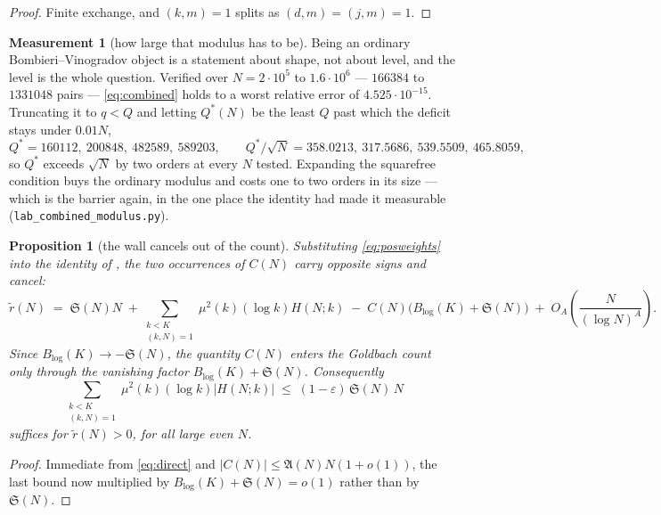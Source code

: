 \documentclass[11pt,a4paper]{article}
\theoremstyle{plain}
\newtheorem{proposition}[theorem]{Proposition}
\theoremstyle{definition}
\newtheorem{measurement}[theorem]{Measurement}
\theoremstyle{remark}
\renewcommand{\SS}{\mathfrak{S}}
\newcommand{\AAA}{\mathfrak{A}}
\begin{document}
\begin{proof}
Finite exchange, and $(k,m)=1$ splits as $(d,m)=(j,m)=1$.
\end{proof}

\begin{measurement}[how large that modulus has to be]\label{meas:combmod}
Being an ordinary Bombieri--Vinogradov object is a statement about
shape, not about level, and the level is the whole question. Verified
over $N=2\cdot10^5$ to $1.6\cdot10^6$ --- $166384$ to $1331048$ pairs
--- \eqref{eq:combined} holds to a worst relative error of
$4.525\cdot10^{-15}$. Truncating it to $q<Q$ and letting $Q^*(N)$ be
the least $Q$ past which the deficit stays under $0.01N$,
\[
  Q^*=160112,\ 200848,\ 482589,\ 589203,
  \qquad
  Q^*/\sqrt N=358.0213,\ 317.5686,\ 539.5509,\ 465.8059,
\]
so $Q^*$ exceeds $\sqrt N$ by two orders at every $N$ tested.
Expanding the squarefree condition buys the ordinary modulus and costs
one to two orders in its size --- which is the barrier again, in the
one place the identity had made it measurable
(\texttt{lab\_combined\_modulus.py}).
\end{measurement}

\begin{proposition}[the wall cancels out of the count]%
\label{prop:direct}
Substituting \eqref{eq:posweights} into the identity of \cite[Thm.~3]{P1},
the two occurrences of $C(N)$ carry opposite signs and cancel:
\begin{equation}\label{eq:direct}
  \tilde r(N)\;=\;\SS(N)N
   \;+\!\!\sum_{\substack{k<K\\(k,N)=1}}\!\!\mu^2(k)(\log k)H(N;k)
   \;-\;C(N)\bigl(B_{\log}(K)+\SS(N)\bigr)
   \;+\;O_A\!\left(\frac{N}{(\log N)^{A}}\right).
\end{equation}
Since $B_{\log}(K)\to-\SS(N)$, the quantity $C(N)$ enters the Goldbach
count only through the vanishing factor $B_{\log}(K)+\SS(N)$.
Consequently
\begin{equation}\label{eq:directcond}
  \sum_{\substack{k<K\\(k,N)=1}}\mu^2(k)(\log k)\bigl|H(N;k)\bigr|
   \;\le\;(1-\varepsilon)\,\SS(N)\,N
\end{equation}
suffices for $\tilde r(N)>0$, for all large even $N$.
\end{proposition}

\begin{proof}
Immediate from \eqref{eq:direct} and $|C(N)|\le\AAA(N)N(1+o(1))$, the
last bound now multiplied by $B_{\log}(K)+\SS(N)=o(1)$ rather than by
$\SS(N)$.
\end{proof}
\end{document}
